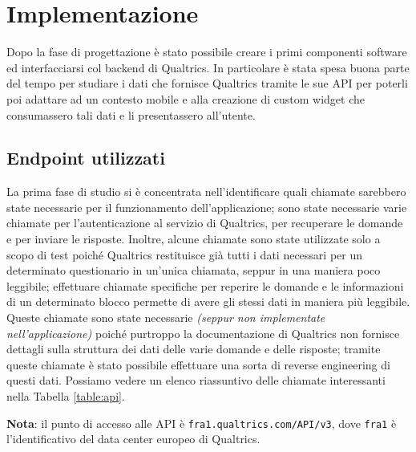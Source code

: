 \chapter{Implementazione}
Dopo la fase di progettazione è stato possibile creare i primi componenti software ed interfacciarsi col backend di Qualtrics. In particolare è stata spesa buona parte del tempo per studiare i dati che fornisce Qualtrics tramite le sue API per poterli poi adattare ad un contesto mobile e alla creazione di custom widget che consumassero tali dati e li presentassero all'utente.

\section{Endpoint utilizzati}
La prima fase di studio si è concentrata nell'identificare quali chiamate sarebbero state necessarie per il funzionamento dell'applicazione; sono state necessarie varie chiamate per l'autenticazione al servizio di Qualtrics, per recuperare le domande e per inviare le risposte. Inoltre, alcune chiamate sono state utilizzate solo a scopo di test poiché Qualtrics restituisce già tutti i dati necessari per un determinato questionario in un'unica chiamata, seppur in una maniera poco leggibile; effettuare chiamate specifiche per reperire le domande e le informazioni di un determinato blocco permette di avere gli stessi dati in maniera più leggibile. Queste chiamate sono state necessarie \textit{(seppur non implementate nell'applicazione)} poiché purtroppo la documentazione di Qualtrics non fornisce dettagli sulla struttura dei dati delle varie domande e delle risposte; tramite queste chiamate è stato possibile effettuare una sorta di reverse engineering di questi dati.
Possiamo vedere un elenco riassuntivo delle chiamate interessanti nella Tabella \ref{table:api}.



\textbf{Nota}: il punto di accesso alle API è \texttt{fra1.qualtrics.com/API/v3}, dove \texttt{fra1} è l'identificativo del data center europeo di Qualtrics.

\newpage

